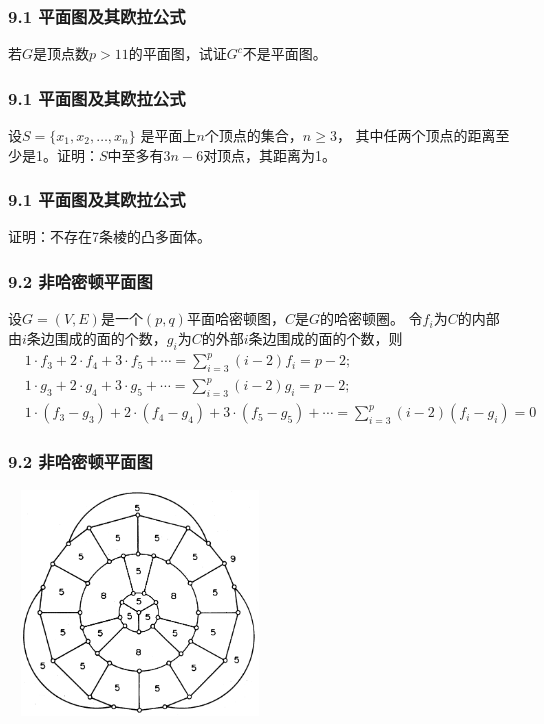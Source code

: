 \documentclass{beamer}
\begin{document}
\begin{CJK}{UTF8}{gbsn}
\begin{frame}
  \frametitle{9.1 平面图及其欧拉公式}
  \begin{exercise3}
    若$G$是顶点数$p > 11$的平面图，试证$G^c$不是平面图。
  \end{exercise3}
\end{frame}
\begin{frame}
  \frametitle{9.1 平面图及其欧拉公式}
  \begin{exercise4}
    设$S = \{x_1, x_2, \ldots, x_n\}$ 是平面上$n$个顶点的集合，$n \geq 3$， 其中任两个顶点的距离至少是1。证明：$S$中至多有$3n-6$对顶点，其距离为1。
  \end{exercise4}
\end{frame}
\begin{frame}
  \frametitle{9.1 平面图及其欧拉公式}
  \begin{exercise5}
    证明：不存在7条棱的凸多面体。
  \end{exercise5}
\end{frame}

\begin{frame}
  \frametitle{9.2 非哈密顿平面图}
  \begin{theorem9.2.1}
    设$G=(V,E)$是一个$(p,q)$平面哈密顿图，$C$是$G$的哈密顿圈。
    令$f_i$为$C$的内部由$i$条边围成的面的个数，$g_i$为$C$的外部$i$条边围成的面的个数，则
    \begin{align}
      &1 \cdot f_3 + 2 \cdot f_4 + 3 \cdot f_5 + \cdots = \sum_{i=3}^p(i-2)f_i = p - 2;\\
      &1 \cdot g_3 + 2 \cdot g_4 + 3 \cdot g_5 + \cdots = \sum_{i=3}^p(i-2)g_i = p - 2;\\
      &1 \cdot (f_3 - g_3) + 2 \cdot (f_4 - g_4) + 3 \cdot (f_5 - g_5) + \cdots = \sum_{i=3}^p(i-2)(f_i - g_i) = 0
    \end{align}
  \end{theorem9.2.1}
\end{frame}

\begin{frame}
  \frametitle{9.2 非哈密顿平面图}
  \centering
  \includegraphics[width=7cm, height=6cm]{grinberg}
\end{frame}


\end{CJK}
\end{document}
